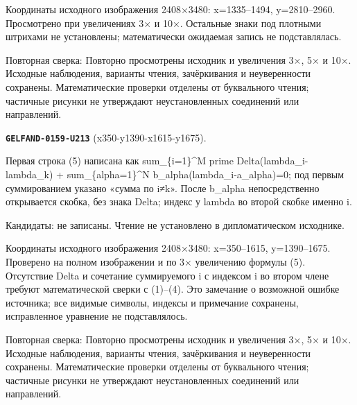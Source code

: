 Координаты исходного изображения 2408×3480: x=1335–1494, y=2810–2960. Просмотрено при увеличениях 3× и 10×. Остальные знаки под плотными штрихами не установлены; математически ожидаемая запись не подставлялась.\par
Повторная сверка: Повторно просмотрены исходник и увеличения 3×, 5× и 10×. Исходные наблюдения, варианты чтения, зачёркивания и неуверенности сохранены. Математические проверки отделены от буквального чтения; частичные рисунки не утверждают неустановленных соединений или направлений.\par\medskip
\par\noindent\leavevmode{}\label{GELFAND-0159-U213}\label{GELFAND-P001468:x350-y1390-x1615-y1675}\textbf{\texttt{GELFAND-0159-U213}} (x350-y1390-x1615-y1675).\nopagebreak[4]\par
Первая строка (5) написана как sum\_\{i=1\}\textasciicircum{}M prime Delta(lambda\_i-lambda\_k) + sum\_\{alpha=1\}\textasciicircum{}N b\_alpha(lambda\_i-a\_alpha)=0; под первым суммированием указано «сумма по i≠k». После b\_alpha непосредственно открывается скобка, без знака Delta; индекс у lambda во второй скобке именно i.\par
Кандидаты: не записаны. Чтение не установлено в дипломатическом исходнике.\par
Координаты исходного изображения 2408×3480: x=350–1615, y=1390–1675. Проверено на полном изображении и по 3× увеличению формулы (5). Отсутствие Delta и сочетание суммируемого i с индексом i во втором члене требуют математической сверки с (1)–(4). Это замечание о возможной ошибке источника; все видимые символы, индексы и примечание сохранены, исправленное уравнение не подставлялось.\par
Повторная сверка: Повторно просмотрены исходник и увеличения 3×, 5× и 10×. Исходные наблюдения, варианты чтения, зачёркивания и неуверенности сохранены. Математические проверки отделены от буквального чтения; частичные рисунки не утверждают неустановленных соединений или направлений.\par\medskip
